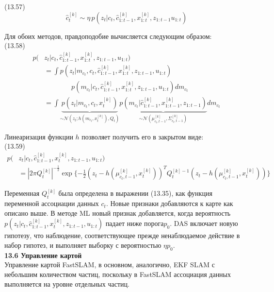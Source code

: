 \documentclass[10pt,a4paper]{article}
\begin{document}
(13.57)
$$\hat{c}_t^{[k]}\sim\eta\,p(z_t|c_t,\hat{c}_{1:t-1}^{[k]},x_{1:t}^{[k]},z_{1:t-1}u_{1:t})$$

Для обоих методов, правдоподобие вычисляется следующим образом:\\

(13.58)
\begin{equation*}
\begin{split}
p(&z_t|c_t,\hat{c}_{1:t-1}^{[k]},x_{1:t}^{[k]},z_{1:t-1},u_{1:t})\\
&=\int p(z_t|m_{c_t},c_t,\hat{c}_{1:t-1}^{[k]},x_{1:t}^{[k]},z_{1:t-1},u_{1:t})\\
&\qquad\qquad p(m_{c_t}|c_t,\hat{c}_{1:t-1}^{[k]},x_{1:t}^{[k]},z_{1:t-1},u_{1:t})dm_{c_t}\\
&=\int\underbrace{p(z_t|m_{c_t},c_t,x_t^{[k]})}_{\sim\mathcal{N}(z_t;h(m_{c_t},x_t^{[k]}),Q_t)}\underbrace{p(m_{c_t}|\hat{c}_{1:t-1}^{[k]},x_{1:t-1}^{[k]},z_{1:t-1})}_{\sim\mathcal{N}(\mu_{c_t,t-1}^{[k]},\varSigma_{c_t,t-1}^{[k]})}dm_{c_t}
\end{split}
\end{equation*}

Линеаризация функции $h$ позволяет получить его в закрытом виде:\\

(13.59)
\begin{equation*}
\begin{split}
p(&z_t|c_t,\hat{c}_{1:t-1}^{[k]},x_t^{[k]},z_{1:t-1},u_{1:t})\\
&=|2\pi Q_t^{[k]}|^{-\frac{1}{2}}\exp\{-\frac{1}{2}(z_t-h(\mu_{c_t,t-1}^{[k]},x_t^{[k]}))^TQ_t^{[k]-1}(z_t-h(\mu_{c_t,t-1}^{[k]},x_t^{[k]}))\}
\end{split}
\end{equation*}

Переменная $Q_t^{[k]}$ была определена в выражении (13.35), как функция переменной ассоциации данных $c_t$. Новые признаки добавляются к карте как описано выше.  В методе ML новый признак добавляется, когда вероятность $p(z_t|c_t, \hat{c}_{1:t-1}^{[k]},x_t^{[k]},z_{1:t-1},u_{1:t})$ падает ниже порога$p_0$. DAS включает новую гипотезу, что наблюдение, соответствующее прежде ненаблюдаемое действие в набор гипотез, и выполняет выборку с вероятностью $\eta p_0$.\\

\textbf{13.6	Управление картой}\\

Управление картой FastSLAM, в основном, аналогично, EKF SLAM с небольшим количеством частиц, поскольку в FastSLAM ассоциация данных выполняется на уровне отдельных частиц.
\end{document}

